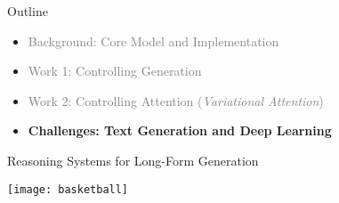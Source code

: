


\begin{frame}{Outline}
  \begin{itemize}
  \item \textcolor{gray}{Background: Core Model and Implementation}
    \air
  \item \textcolor{gray}{Work 1: Controlling  Generation  }
    \air

  \item \textcolor{gray}{Work 2: Controlling Attention (\textit{Variational Attention})}
    \air


  \item \textbf{Challenges: Text Generation and Deep Learning}
  \end{itemize}

\end{frame}







\begin{frame}{Reasoning Systems for Long-Form Generation}
  \begin{center}
    \texttt{[image: basketball]}
  \end{center}
\end{frame}





